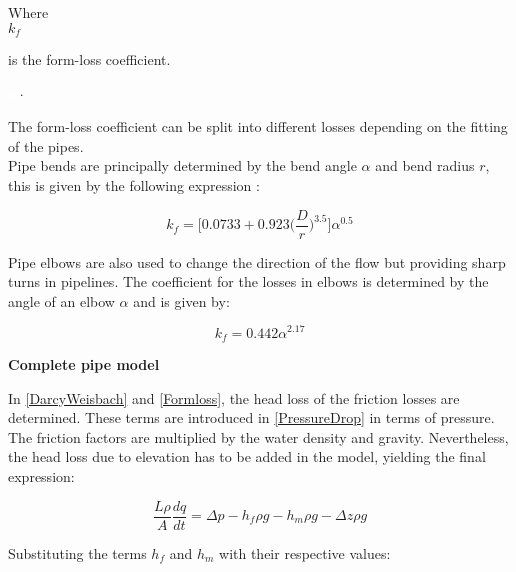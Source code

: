  \begin{minipage}[t]{0.20\textwidth}
Where\\
\hspace*{8mm} $k_f$ 
\end{minipage}
\begin{minipage}[t]{0.68\textwidth}
\vspace*{2mm}
is the form-loss coefficient.  
 \end{minipage}
\begin{minipage}[t]{0.10\textwidth}
\vspace*{2mm}
\textcolor{White}{te}$\unit{\cdot}$
\end{minipage}

The form-loss coefficient can be split into different losses depending on the 
fitting of the pipes. 
\\
Pipe bends are principally determined by the 
bend angle $\alpha$ and bend radius $r$, this is given by the following 
expression \cite{Design_Water}: 

\begin{equation}
  k_f = \bigg[0.0733 + 0.923 \bigg(\frac{D}{r}\bigg)^{3.5}\bigg]\alpha^{0.5}
  \label{kfriction}
\end{equation}

Pipe elbows are also used to change the direction of the flow but providing 
sharp turns in pipelines. The coefficient for the losses in elbows is determined by the angle of an elbow $\alpha$ and is given by:

\begin{equation}
  k_f = 0.442\alpha^{2.17}
\end{equation}

\textbf{Complete pipe model}
\label{CompletePipe}    %

In \eqref{DarcyWeisbach} and \eqref{Formloss}, the head loss of the friction losses are determined. These terms are introduced in \eqref{PressureDrop} in terms of pressure. The friction factors are multiplied by the water density and gravity. Nevertheless, the head loss due to elevation has to be added in the model, yielding the final expression:

\begin{equation}
   \frac{L \rho}{A} \frac{dq}{dt} =\Delta p - h_f \rho g - h_m \rho g - \Delta z \rho 
   g
\end{equation}

Substituting the terms $h_f$ and $h_m$ with their respective values:


